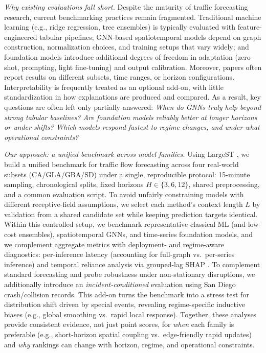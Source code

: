 \documentclass[10pt]{article}
\begin{document}
\textit{Why existing evaluations fall short.}
Despite the maturity of traffic forecasting research, current benchmarking practices remain fragmented. Traditional machine learning (e.g., ridge regression, tree ensembles) is typically evaluated with feature-engineered tabular pipelines; GNN-based spatiotemporal models depend on graph construction, normalization choices, and training setups that vary widely; and foundation models introduce additional degrees of freedom in adaptation (zero-shot, prompting, light fine-tuning) and output calibration. Moreover, papers often report results on different subsets, time ranges, or horizon configurations. Interpretability is frequently treated as an optional add-on, with little standardization in how explanations are produced and compared. As a result, key questions are often left only partially answered: \emph{When do GNNs truly help beyond strong
tabular baselines? Are foundation models reliably better at longer horizons or under shifts? Which models respond
fastest to regime changes, and under what operational constraints?}


\textit{Our approach: a unified benchmark across model families.}
Using {LargeST} \cite{liu2023largest}, we build a unified benchmark for traffic flow forecasting across four
real-world subsets (CA/GLA/GBA/SD) under a single, reproducible protocol: 15-minute sampling, chronological splits,
fixed horizons $H \in \{3,6,12\}$, shared preprocessing, and a common evaluation script. To avoid unfairly constraining models with different receptive-field assumptions, we select each method's context length $L$ by validation from a shared candidate set while keeping prediction targets identical. Within this controlled setup, we benchmark
representative classical ML (and low-cost ensembles), spatiotemporal GNNs, and time-series foundation models, and we complement aggregate metrics with deployment- and regime-aware diagnostics: per-inference latency (accounting for
full-graph vs.\ per-series inference) and temporal reliance analysis via grouped-lag SHAP \cite{lundberg2017shap}. To complement standard forecasting and probe robustness under non-stationary disruptions, we additionally
introduce an \emph{incident-conditioned} evaluation using San Diego crash/collision records. This add-on turns the
benchmark into a stress test for distribution shift driven by special events, revealing regime-specific inductive
biases (e.g., global smoothing vs.\ rapid local response).
Together, these analyses provide consistent evidence, not just point scores, for \emph{when} each family is
preferable (e.g., short-horizon spatial coupling vs.\ edge-friendly rapid updates) and \emph{why} rankings can change
with horizon, regime, and operational constraints.
\end{document}
